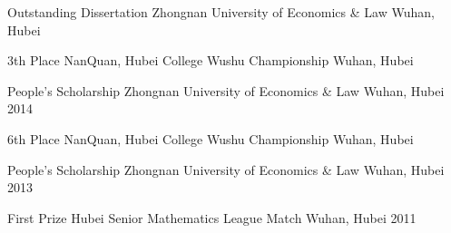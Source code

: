 \begin{cvhonors}
\cvhonor
{Outstanding Dissertation} %
{Zhongnan University of Economics \& Law} %
{Wuhan, Hubei} %
{ } %



\cvhonor
{3th Place} %
{NanQuan, Hubei College Wushu Championship} %
{Wuhan, Hubei} %
{ } %


\cvhonor
{People’s Scholarship} %
{Zhongnan University of Economics \& Law} %
{Wuhan, Hubei} %
{2014} %


\cvhonor
{6th Place} %
{NanQuan, Hubei College Wushu Championship} %
{Wuhan, Hubei} %
{ } %


\cvhonor
{People’s Scholarship} %
{Zhongnan University of Economics \& Law} %
{Wuhan, Hubei} %
{2013} %


\cvhonor
{First Prize} %
{Hubei Senior Mathematics League Match} %
{Wuhan, Hubei} %
{2011} %

\end{cvhonors}